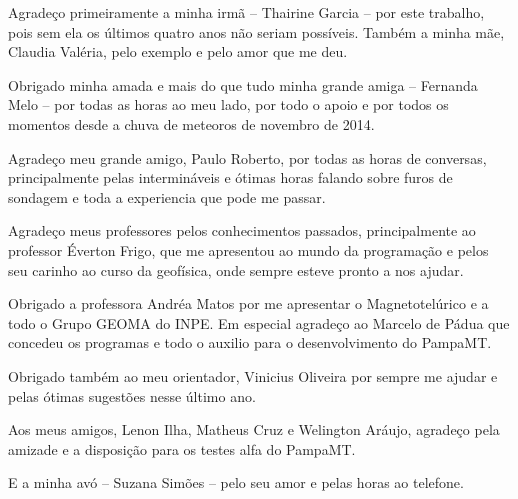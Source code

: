 \documentclass[12pt,twoside,oneright,a4paper,chapter=TITLE,english,brazil]{unipampa}
\begin{document}
\begin{agradecimentos}
    Agradeço primeiramente a minha irmã -- Thairine Garcia -- por este trabalho, pois sem ela os últimos quatro anos não seriam possíveis. Também a minha mãe, Claudia Valéria, pelo exemplo e pelo amor que me deu. 
    
    \SingleSpacing
    \OnehalfSpacing
    
    \noindent Obrigado minha amada e mais do que tudo minha grande amiga -- Fernanda Melo -- por todas as horas ao meu lado, por todo o apoio e por todos os momentos desde a chuva de meteoros de novembro de 2014.
    
    \SingleSpacing
    \OnehalfSpacing
    
    \noindent Agradeço meu grande amigo, Paulo Roberto, por todas as horas de conversas, principalmente pelas intermináveis e ótimas horas falando sobre furos de sondagem e toda a experiencia que pode me passar.  
    
    \SingleSpacing
    \OnehalfSpacing
    
    \noindent Agradeço meus professores pelos conhecimentos passados, principalmente ao professor Éverton Frigo, que me apresentou ao mundo da programação e pelos seu carinho ao curso da geofísica, onde sempre esteve pronto a nos ajudar.
    
    \SingleSpacing
    \OnehalfSpacing
    
    \noindent Obrigado a professora Andréa Matos por me apresentar o Magnetotelúrico e a todo o Grupo GEOMA do INPE. Em especial agradeço ao Marcelo de Pádua que concedeu os programas e todo o auxilio para o desenvolvimento do PampaMT.   
    
    \SingleSpacing
    \OnehalfSpacing

    \noindent Obrigado também ao meu orientador, Vinicius Oliveira por sempre me ajudar e pelas ótimas sugestões nesse último ano.
    
    \SingleSpacing
    \OnehalfSpacing
    
    \noindent Aos meus amigos, Lenon Ilha, Matheus Cruz e Welington Aráujo, agradeço pela amizade e a disposição para os testes alfa do PampaMT.
    
    \SingleSpacing
    \OnehalfSpacing
    
    \noindent E a minha avó -- Suzana Simões -- pelo seu amor e pelas horas ao telefone.
    
\end{agradecimentos}
\end{document}
